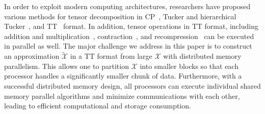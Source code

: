 \documentclass[11pt,a4paper,review]{siamart220329}
\begin{document}
In order to exploit modern computing architectures, researchers have proposed various methods for tensor decomposition in CP~\cite{li2017model,smith2015splatt}, Tucker and hierarchical Tucker~\cite{austin2016parallel,grasedyck2019parallel,ballard2020tuckermpi,kaya2016high}, and TT~\cite{shi2023parallel,grigori2020parallel,chen2017parallelized,wang2020adtt,dolgov2020parallel} format. In addition, tensor operations in TT format, including addition and multiplication~\cite{daas2022parallel}, contraction~\cite{solomonik2014massively}, and recompression~\cite{al2023randomized} can be executed in parallel as well. The major challenge we address in this paper is to construct an approximation $\tilde{\mathcal{X}}$ in a TT format from large $\mathcal{X}$ with distributed memory parallelism. This allows one to partition $\mathcal{X}$ into smaller blocks so that each processor handles a significantly smaller chunk of data. Furthermore, with a successful distributed memory design, all processors can execute individual shared memory parallel algorithms and minimize communications with each other, leading to efficient computational and storage consumption.
\end{document}
